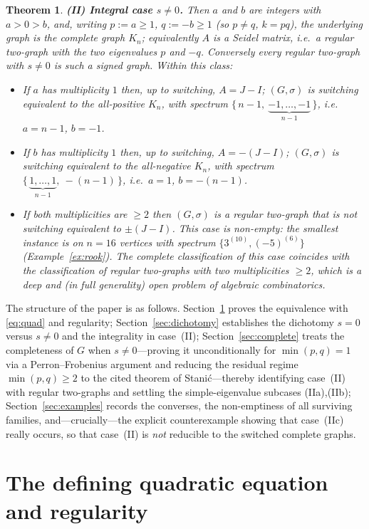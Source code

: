 \documentclass{amsart}
\newtheorem{theorem}{Theorem}
\theoremstyle{definition}
\begin{document}
\begin{theorem}
\smallskip
\textbf{(II) Integral case $s\ne 0$.}
Then $a$ and $b$ are integers with $a>0>b$, and, writing $p:=a\ge1$,
$q:=-b\ge1$ (so $p\ne q$, $k=pq$), the underlying graph is the complete graph
$K_n$; equivalently $A$ is a Seidel matrix, i.e.\ a regular two-graph with the
two eigenvalues $p$ and $-q$. Conversely every regular two-graph with $s\ne0$
is such a signed graph. Within this class:
\begin{itemize}
\item[(IIa)] If $a$ has multiplicity $1$ then, up to switching, $A=J-I$;
$(G,\sigma)$ is switching equivalent to the all-positive $K_n$, with spectrum
$\{\,n-1,\ \underbrace{-1,\dots,-1}_{n-1}\,\}$, i.e.\ $a=n-1$, $b=-1$.
\item[(IIb)] If $b$ has multiplicity $1$ then, up to switching, $A=-(J-I)$;
$(G,\sigma)$ is switching equivalent to the all-negative $K_n$, with spectrum
$\{\,\underbrace{1,\dots,1}_{n-1},\ -(n-1)\,\}$, i.e.\ $a=1$, $b=-(n-1)$.
\item[(IIc)] If both multiplicities are $\ge2$ then $(G,\sigma)$ is a regular
two-graph that is \emph{not} switching equivalent to $\pm(J-I)$. This case is
non-empty: the smallest instance is on $n=16$ vertices with spectrum
$\{3^{(10)},(-5)^{(6)}\}$ (Example~\ref{ex:rook}). The complete classification
of this case coincides with the classification of regular two-graphs with two
multiplicities $\ge2$, which is a deep and (in full generality) open problem of
algebraic combinatorics.
\end{itemize}
\end{theorem}

The structure of the paper is as follows. Section~\ref{sec:quad} proves the
equivalence with \eqref{eq:quad} and regularity; Section~\ref{sec:dichotomy}
establishes the dichotomy $s=0$ versus $s\ne0$ and the integrality in
case~(II); Section~\ref{sec:complete} treats the completeness of $G$ when
$s\ne0$---proving it unconditionally for $\min(p,q)=1$ via a
Perron--Frobenius argument and reducing the residual regime $\min(p,q)\ge2$ to
the cited theorem of Stani\'c---thereby identifying case~(II) with regular
two-graphs and settling the simple-eigenvalue subcases (IIa),(IIb);
Section~\ref{sec:examples} records the converses, the
non-emptiness of all surviving families, and---crucially---the explicit
counterexample showing that case~(IIc) really occurs, so that case~(II) is
\emph{not} reducible to the switched complete graphs.

\section{The defining quadratic equation and regularity}\label{sec:quad}
\end{document}
